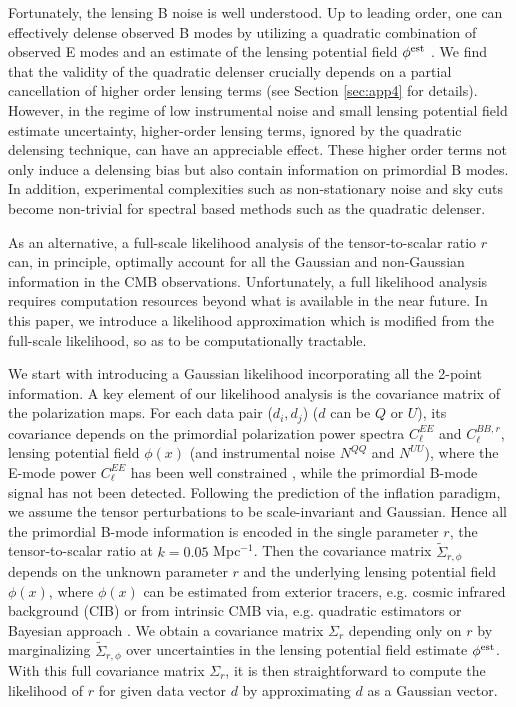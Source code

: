 \documentclass[aps, prd, reprint, nofootinbib, groupedaddress, showpacs]{revtex4-1}
\begin{document}
Fortunately,  the lensing B noise is well understood.
Up to leading order, one can effectively delense observed B modes by utilizing
a quadratic combination of observed E modes and an estimate of the lensing potential field $\phi^{\rm est}$
\citep{Knox2002, Kesden2002, Seljak2003a, Simard2015a, Sherwin2015}.
We find that the validity of the quadratic delenser crucially depends on a partial cancellation of
higher order lensing terms (see Section \ref{sec:app4} for details).
However, in the regime of low instrumental noise and small lensing potential field estimate uncertainty,
higher-order lensing terms, ignored by the quadratic delensing technique,
can have an appreciable effect. These higher order terms not only induce
a delensing bias but also contain information on primordial B modes.
In addition, experimental complexities such as non-stationary noise and sky cuts
become non-trivial for spectral based methods such as the quadratic delenser.

As an alternative, a full-scale likelihood analysis of the tensor-to-scalar ratio $r$ can,
in principle, optimally account for all the Gaussian and non-Gaussian information in the CMB observations.
Unfortunately, a full likelihood analysis requires computation resources beyond
what is available in the near future.
In this paper, we introduce a likelihood approximation which is modified from the full-scale
likelihood, so as to be computationally tractable.

We start with introducing a Gaussian likelihood incorporating all the 2-point information.
A key element of our likelihood analysis is the covariance matrix of the polarization maps.
For each data pair ($d_i, d_j$) ($d$ can be $Q$ or $U$),  its covariance
depends on the primordial polarization power spectra $C_\ell^{EE}$ and $C_\ell^{BB,r}$,
lensing potential field $\phi(x)$ (and instrumental noise $N^{QQ}$ and $N^{UU}$),
where the E-mode power $C_\ell^{EE}$ has been well constrained
\citep[e.g.][]{PlanckCollaborationXI2015, PlanckCollaborationXIII2015},
while the primordial B-mode signal has not been detected.
Following the prediction of the inflation paradigm,
we assume the tensor perturbations to be scale-invariant and Gaussian.
Hence all the primordial B-mode  information is encoded in the single parameter $r$, the
tensor-to-scalar ratio at $k=0.05$ Mpc$^{-1}$.
Then the covariance matrix $\tilde \Sigma_{r,\phi}$
depends on the unknown parameter $r$ and the underlying lensing potential field $\phi(x)$,
where $\phi(x)$ can be estimated from exterior tracers, e.g. cosmic infrared background (CIB)
\citep{Song2003, Dole2006, PlanckCollaborationXVII2014,%
PlanckCollaboration2015a, Larsen2016, Manzotti2017} or
from intrinsic CMB via, e.g. quadratic estimators \citep{Hu2001, Hu2002b}
or Bayesian approach \citep{Hirata2003a, Hirata2003,Anderes2011, Anderes2015, Millea2017}.
We obtain a covariance matrix $\Sigma_r$ depending only on $r$ by marginalizing $\tilde \Sigma_{r,\phi}$
over uncertainties in the lensing potential field estimate $\phi^{\rm est}$.
With this full covariance matrix $\Sigma_r$, it is then straightforward to compute the likelihood of $r$
for given data vector $d$ by approximating $d$ as a Gaussian vector.
\end{document}
